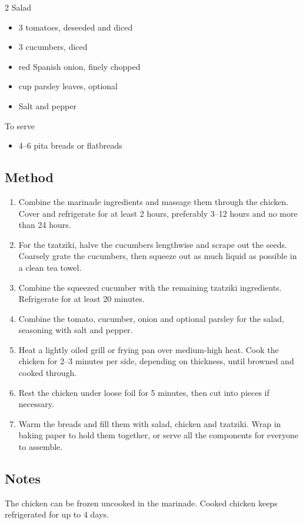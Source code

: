 \begin{multicols}{2}
    Salad

    \begin{itemize}
        \item 3 tomatoes, deseeded and diced
        \item 3 cucumbers, diced
        \item {} red Spanish onion, finely chopped
        \item {} cup parsley leaves, optional
        \item Salt and pepper
    \end{itemize}

    To serve

    \begin{itemize}
        \item 4--6 pita breads or flatbreads
    \end{itemize}
\end{multicols}

\subsection{Method}

\begin{enumerate}
    \item Combine the marinade ingredients and massage them through the chicken. Cover and refrigerate for at least 2 hours, preferably 3--12 hours and no more than 24 hours.
    \item For the tzatziki, halve the cucumbers lengthwise and scrape out the seeds. Coarsely grate the cucumbers, then squeeze out as much liquid as possible in a clean tea towel.
    \item Combine the squeezed cucumber with the remaining tzatziki ingredients. Refrigerate for at least 20 minutes.
    \item Combine the tomato, cucumber, onion and optional parsley for the salad, seasoning with salt and pepper.
    \item Heat a lightly oiled grill or frying pan over medium-high heat. Cook the chicken for 2--3 minutes per side, depending on thickness, until browned and cooked through.
    \item Rest the chicken under loose foil for 5 minutes, then cut into pieces if necessary.
    \item Warm the breads and fill them with salad, chicken and tzatziki. Wrap in baking paper to hold them together, or serve all the components for everyone to assemble.
\end{enumerate}

\subsection{Notes}

The chicken can be frozen uncooked in the marinade. Cooked chicken keeps refrigerated for up to 4 days.
